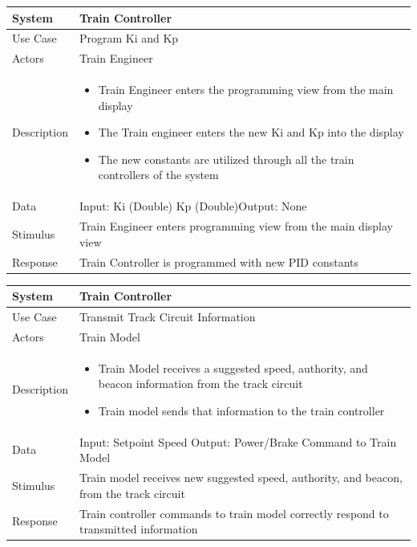 \documentclass{article}
\begin{document}
    \begin{longtable}{
    || >{\raggedright\arraybackslash}m{}
    | >{\raggedright\arraybackslash}m{}||}
    \hline
    \textbf{System} & \textbf{Train Controller} \\
    \hline
    Use Case & Program Ki and Kp\\
    \hline
    Actors & Train Engineer\\
    \hline
    Description & \begin{itemize}
        \item Train Engineer enters the programming view from the main display
        \item The Train engineer enters the new Ki and Kp into the display
        \item The new constants are utilized through all the train controllers of the system
    \end{itemize}\\
    \hline
    Data & Input: Ki (Double) Kp (Double)\newline Output: None \\
    \hline
    Stimulus & Train Engineer enters programming view from the main display view\\
    \hline
    Response & Train Controller is programmed with new PID constants\\
    \hline
    \end{longtable}
    
    \begin{longtable}{
    || >{\raggedright\arraybackslash}m{}
    | >{\raggedright\arraybackslash}m{}||}
    \hline
    \textbf{System} & \textbf{Train Controller} \\
    \hline
    Use Case & Transmit Track Circuit Information\\
    \hline
    Actors & Train Model\\
    \hline
    Description & \begin{itemize}
        \item Train Model receives a suggested speed, authority, and beacon information from the track circuit
        \item Train model sends that information to the train controller
    \end{itemize}\\
    \hline
    Data & Input: Setpoint Speed \newline Output: Power/Brake Command to Train Model\\
    \hline
    Stimulus & Train model receives new suggested speed, authority, and beacon, from the track circuit\\
    \hline
    Response & Train controller commands to train model correctly respond to transmitted information \\
    \hline
    \end{longtable}
    
\end{document}
